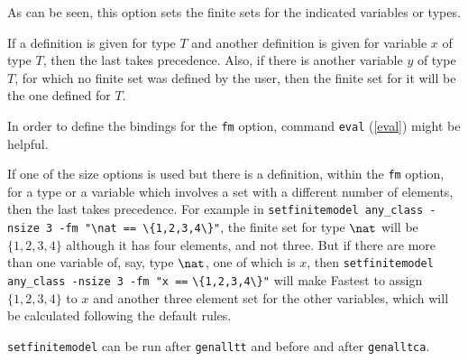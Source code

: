 \begin{itemize}
As can be seen, this option sets the finite sets for the indicated variables or types. 


If a definition is given for type $T$ and another definition is given for variable $x$ of type $T$, then the last takes precedence. Also, if there is another variable $y$ of type $T$, for which no finite set was defined by the user, then the finite set for it will be the one defined for $T$.

In order to define the bindings for the \verb+fm+ option, command \verb+eval+ (\ref{eval}) might be helpful.
\end{itemize}

If one of the size options is used but there is a definition, within the \verb+fm+ option, for a type or a variable which involves a set with a different number of elements, then the last takes precedence. For example in \verb+setfinitemodel any_class -nsize 3 -fm "\nat == \{1,2,3,4\}"+, the finite set for type $\nat$ will be $\{1,2,3,4\}$ although it has four elements, and not three. But if there are more than one variable of, say, type $\nat$, one of which is $x$, then \verb+setfinitemodel any_class -nsize 3 -fm "x ==+ \verb+\{1,2,3,4\}"+ will make Fastest to assign $\{1,2,3,4\}$ to $x$ and another three element set for the other variables, which will be calculated following the default rules.

\verb+setfinitemodel+ can be run after \verb+genalltt+ and before and after \verb+genalltca+. 





